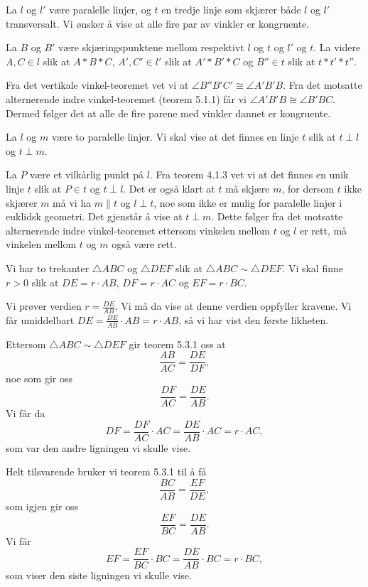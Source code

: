 

\begin{oppgave}[5.1.1]
    La $l$ og $l'$ være paralelle linjer, og $t$ en tredje linje som skjærer både $l$ og $l'$ transversalt. 
    Vi ønsker å vise at alle fire par av vinkler er kongruente. 

    La $B$ og $B'$ være skjæringspunktene mellom respektivt $l$ og $t$ og $l'$ og $t$. 
    La videre $A, C\in l$ slik at $A\ast B\ast C$, $A', C'\in l'$ slik at $A'\ast B'\ast C$ og $B''\in t$ slik at $t\ast t'\ast t''$. 

    \begin{figure}
        
    \end{figure}

    Fra det vertikale vinkel-teoremet vet vi at $\angle B''B'C'\cong \angle A'B'B$. 
    Fra det motsatte alternerende indre vinkel-teoremet (teorem 5.1.1) får vi $\angle A'B'B\cong \angle B'BC$.
    Dermed følger det at alle de fire parene med vinkler dannet er kongruente. 
\end{oppgave}

\begin{oppgave}[5.1.9]
    La $l$ og $m$ være to paralelle linjer. 
    Vi skal vise at det finnes en linje $t$ slik at $t\perp l$ og $t\perp m$. 
    
    La $P$ være et vilkårlig punkt på $l$. 
    Fra teorem 4.1.3 vet vi at det finnes en unik linje $t$ slik at $P\in t$ og $t\perp l$.
    Det er også klart at $t$ må skjære $m$, for dersom $t$ ikke skjærer $m$ må vi ha $m\parallel t$ og $l\perp t$, noe som ikke er mulig for paralelle linjer i euklidsk geometri.
    Det gjenstår å vise at $t\perp m$. 
    Dette følger fra det motsatte alternerende indre vinkel-teoremet ettersom vinkelen mellom $t$ og $l$ er rett, må vinkelen mellom $t$ og $m$ også være rett. 
\end{oppgave}

\begin{oppgave}[5.3.1]
    Vi har to trekanter $\triangle ABC$ og $\triangle DEF$ slik at $\triangle ABC \sim \triangle DEF$. 
    Vi skal finne $r>0$ slik at $DE=r\cdot AB$, $DF=r\cdot AC$ og $EF=r\cdot BC$. 

    Vi prøver verdien $r=\frac{DE}{AB}$. 
    Vi må da vise at denne verdien oppfyller kravene. 
    Vi får umiddelbart $DE= \frac{DE}{AB}\cdot AB = r\cdot AB$, så vi har vist den første likheten. 
    
    Ettersom $\triangle ABC\sim\triangle DEF$ gir teorem 5.3.1 oss at 
    $$\frac{AB}{AC}=\frac{DE}{DF},$$
    noe som gir oss 
    $$\frac{DF}{AC}=\frac{DE}{AB}.$$
    Vi får da
    $$DF = \frac{DF}{AC}\cdot AC=\frac{DE}{AB}\cdot AC = r\cdot AC,$$
    som var den andre ligningen vi skulle vise. 
    
    Helt tilsvarende bruker vi teorem 5.3.1 til å få 
    $$\frac{BC}{AB}=\frac{EF}{DE},$$
    som igjen gir oss 
    $$\frac{EF}{BC}=\frac{DE}{AB}.$$
    Vi får 
    $$EF=\frac{EF}{BC}\cdot BC = \frac{DE}{AB}\cdot BC = r\cdot BC,$$
    som viser den siste ligningen vi skulle vise. 
\end{oppgave}

